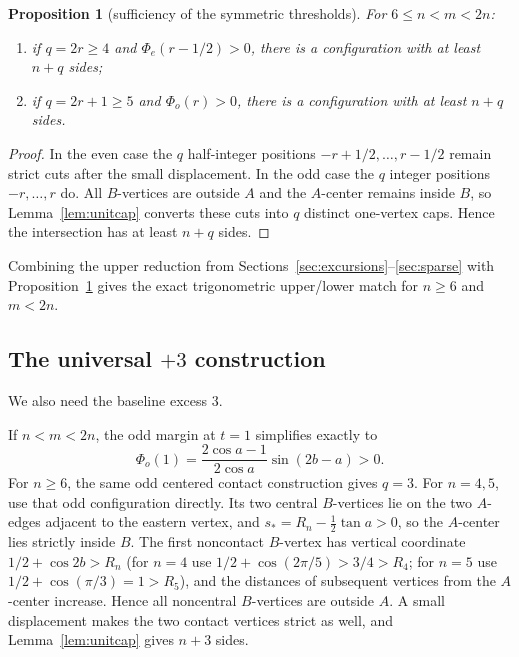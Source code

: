 \documentclass[11pt]{article}
\newtheorem{proposition}[theorem]{Proposition}
\theoremstyle{remark}
\begin{document}
\begin{proposition}[sufficiency of the symmetric thresholds]\label{prop:sufficiency}
For $6\le n<m<2n$:
\begin{enumerate}[label=(\roman*)]
\item if $q=2r\ge4$ and $\Phi_e(r-1/2)>0$, there is a configuration with at least $n+q$ sides;
\item if $q=2r+1\ge5$ and $\Phi_o(r)>0$, there is a configuration with at least $n+q$ sides.
\end{enumerate}
\end{proposition}

\begin{proof}
In the even case the $q$ half-integer positions $-r+1/2,\ldots,r-1/2$ remain strict cuts after the small displacement. In the odd case the $q$ integer positions $-r,\ldots,r$ do. All $B$-vertices are outside $A$ and the $A$-center remains inside $B$, so Lemma~\ref{lem:unitcap} converts these cuts into $q$ distinct one-vertex caps. Hence the intersection has at least $n+q$ sides.
\end{proof}

Combining the upper reduction from Sections~\ref{sec:excursions}--\ref{sec:sparse} with Proposition~\ref{prop:sufficiency} gives the exact trigonometric upper/lower match for $n\ge6$ and $m<2n$.

\subsection{The universal \texorpdfstring{$+3$}{+3} construction}

We also need the baseline excess $3$.

If $n<m<2n$, the odd margin at $t=1$ simplifies exactly to
\[
\Phi_o(1)=\frac{2\cos a-1}{2\cos a}\sin(2b-a)>0.
\tag{6.5}
\]
For $n\ge6$, the same odd centered contact construction gives $q=3$. For $n=4,5$, use that odd configuration directly. Its two central $B$-vertices lie on the two $A$-edges adjacent to the eastern vertex, and $s_*=R_n-\tfrac12\tan a>0$, so the $A$-center lies strictly inside $B$. The first noncontact $B$-vertex has vertical coordinate $1/2+\cos2b>R_n$ (for $n=4$ use $1/2+\cos(2\pi/5)>3/4>R_4$; for $n=5$ use $1/2+\cos(\pi/3)=1>R_5$), and the distances of subsequent vertices from the $A$-center increase. Hence all noncentral $B$-vertices are outside $A$. A small displacement makes the two contact vertices strict as well, and Lemma~\ref{lem:unitcap} gives $n+3$ sides.
\end{document}
